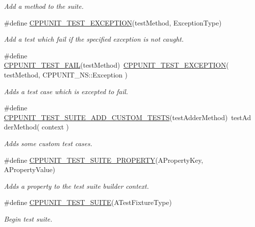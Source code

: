 \begin{DoxyCompactItemize}
\begin{DoxyCompactList}\small\item\em Add a method to the suite. \end{DoxyCompactList}\item 
\#define \hyperlink{group___writing_test_fixture_gaca8eeb6f60714baade6cbfd185868c40}{C\+P\+P\+U\+N\+I\+T\+\_\+\+T\+E\+S\+T\+\_\+\+E\+X\+C\+E\+P\+T\+I\+O\+N}(test\+Method, Exception\+Type)
\begin{DoxyCompactList}\small\item\em Add a test which fail if the specified exception is not caught. \end{DoxyCompactList}\item 
\#define \hyperlink{group___writing_test_fixture_ga5bdaf0444216a8f93ead13d5ae964d7e}{C\+P\+P\+U\+N\+I\+T\+\_\+\+T\+E\+S\+T\+\_\+\+F\+A\+I\+L}(test\+Method)~\hyperlink{group___writing_test_fixture_gaca8eeb6f60714baade6cbfd185868c40}{C\+P\+P\+U\+N\+I\+T\+\_\+\+T\+E\+S\+T\+\_\+\+E\+X\+C\+E\+P\+T\+I\+O\+N}( test\+Method, C\+P\+P\+U\+N\+I\+T\+\_\+\+N\+S\+::\+Exception )
\begin{DoxyCompactList}\small\item\em Adds a test case which is excepted to fail. \end{DoxyCompactList}\item 
\#define \hyperlink{group___writing_test_fixture_ga516fec19cd7a7acb6fbf194bd98c4c09}{C\+P\+P\+U\+N\+I\+T\+\_\+\+T\+E\+S\+T\+\_\+\+S\+U\+I\+T\+E\+\_\+\+A\+D\+D\+\_\+\+C\+U\+S\+T\+O\+M\+\_\+\+T\+E\+S\+T\+S}(test\+Adder\+Method)~test\+Adder\+Method( context )
\begin{DoxyCompactList}\small\item\em Adds some custom test cases. \end{DoxyCompactList}\item 
\#define \hyperlink{group___writing_test_fixture_gac5ac4d8544ac2648a28bf7e4dcb27b9d}{C\+P\+P\+U\+N\+I\+T\+\_\+\+T\+E\+S\+T\+\_\+\+S\+U\+I\+T\+E\+\_\+\+P\+R\+O\+P\+E\+R\+T\+Y}(A\+Property\+Key, A\+Property\+Value)
\begin{DoxyCompactList}\small\item\em Adds a property to the test suite builder context. \end{DoxyCompactList}\item 
\#define \hyperlink{group___writing_test_fixture_gabe1e12200f40d6f25d60c1783c99da81}{C\+P\+P\+U\+N\+I\+T\+\_\+\+T\+E\+S\+T\+\_\+\+S\+U\+I\+T\+E}(A\+Test\+Fixture\+Type)
\begin{DoxyCompactList}\small\item\em Begin test suite. \end{DoxyCompactList}\item 

\end{DoxyCompactItemize}
